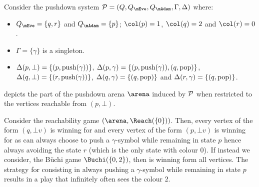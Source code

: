 \begin{example}\label{10-ex:pushdown-game-1}
Consider the pushdown system $\PDS = (Q,Q_{\mEve}, Q_{\mAdam}, \Gamma,\Delta)$ where:
\begin{itemize}
	\item $Q_{\mEve}=\{q,r\}$ and $Q_{\mAdam}=\{p\}$; $\pdscol{p} = 1$, $\pdscol{q} = 2$ and $\pdscol{r} = 0$.
	\item $\Gamma=\{\gamma\}$ is a singleton.
	\item $\Delta(p,\bot) = \{(p,\mathrm{push}(\gamma))\}$, $\Delta(p,\gamma) = \{(p,\mathrm{push}(\gamma)),(q,\mathrm{pop})\}$, $\Delta(q,\bot) = \{(r,\mathrm{push}(\gamma))\}$, $\Delta(q,\gamma) = \{(q,\mathrm{pop})\}$ and $\Delta(r,\gamma) = \{(q,\mathrm{pop})\}$.
\end{itemize}

 depicts the part of the pushdown arena $\arena$ induced by $\mathcal{P}$ when restricted to the vertices reachable from $(p,\bot)$.

Consider the reachability game $(\arena, \Reach(\{0\}))$. Then, every vertex of the form $(q,\bot v)$ is winning for \Eve and every vertex of the form $(p,\bot v)$ is winning for \Adam as \Adam can always choose to push a $\gamma$-symbol while remaining in state $p$ hence always avoiding the state $r$ (which is the only state with colour $0$). If instead we consider, the B{\"u}chi game $\Buchi(\{0,2\})$, then \Eve is winning form all vertices. The strategy for \Adam consisting in always pushing a $\gamma$-symbol while remaining in state $p$ results in a play that infinitely often sees the colour $2$.

\begin{figure}[htb]
\begin{center}
\end{center}
\end{figure}
\end{example}

